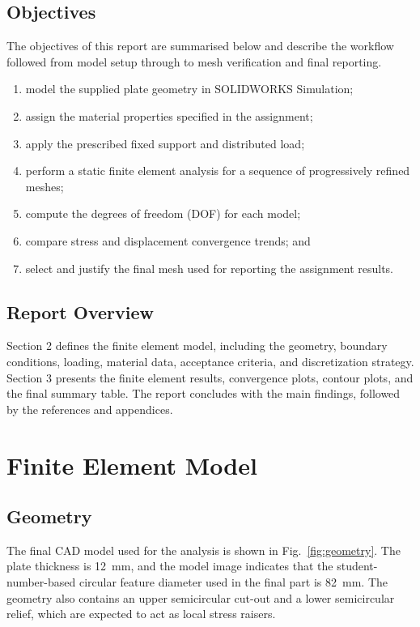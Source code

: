 \documentclass[11pt,a4paper]{article}
\newcommand{\software}{SOLIDWORKS Simulation}
\begin{document}
\subsection{Objectives}
The objectives of this report are summarised below and describe the workflow followed from model setup through to mesh verification and final reporting.
\begin{enumerate}
    \item model the supplied plate geometry in \software;
    \item assign the material properties specified in the assignment;
    \item apply the prescribed fixed support and distributed load;
    \item perform a static finite element analysis for a sequence of progressively refined meshes;
    \item compute the degrees of freedom (DOF) for each model;
    \item compare stress and displacement convergence trends; and
    \item select and justify the final mesh used for reporting the assignment results.
\end{enumerate}

\subsection{Report Overview}
Section 2 defines the finite element model, including the geometry, boundary conditions, loading, material data, acceptance criteria, and discretization strategy. Section 3 presents the finite element results, convergence plots, contour plots, and the final summary table. The report concludes with the main findings, followed by the references and appendices.

\section{Finite Element Model}

\subsection{Geometry}
The final CAD model used for the analysis is shown in Fig.~\ref{fig:geometry}. The plate thickness is \SI{12}{mm}, and the model image indicates that the student-number-based circular feature diameter used in the final part is \SI{82}{mm}. The geometry also contains an upper semicircular cut-out and a lower semicircular relief, which are expected to act as local stress raisers.
\end{document}
